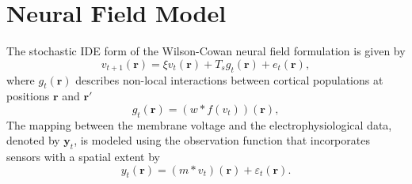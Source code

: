 \documentclass[]{article}
\begin{document}

\newpage
\section*{Neural Field Model}
The stochastic IDE form of the Wilson-Cowan neural field  formulation is given by 
\begin{equation}
	\label{eq:DiscreteTimeModel} 
	v_{t+1}\left(\mathbf{r}\right) = 
	\xi v_t\left(\mathbf{r}\right) + 
	T_s g_t\left( \mathbf{r}\right) 
	+ e_t\left(\mathbf{r}\right), 
\end{equation}
where $g_t(\mathbf r)$ describes non-local interactions between cortical populations at positions $\mathbf{r}$ and $\mathbf{r}'$ 
\begin{equation}
	\label{eq:RateBasedInteractions} g_t\left( \mathbf{r}\right) = (w \ast f(v_t))(\mathbf r),
\end{equation}
The mapping between the membrane voltage and the electrophysiological data, denoted by $\mathbf{y}_t$, is modeled using the observation function that incorporates sensors with a spatial extent by
\begin{equation}\label{eq:ObservationEquation}
	y_t(\mathbf{r}) = (m\ast v_t)(\mathbf r) + \varepsilon_t(\mathbf{r}).
\end{equation}
\end{document}
